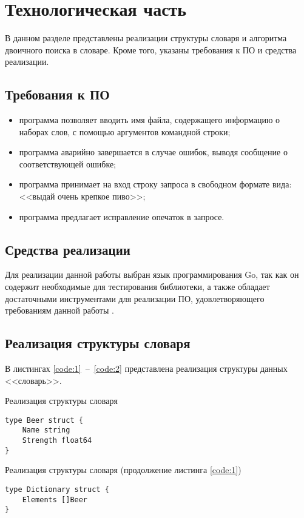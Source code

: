 \chapter{Технологическая часть}

В данном разделе представлены реализации структуры словаря и алгоритма двоичного поиска в словаре. Кроме того, указаны требования к ПО и средства реализации.

\section{Требования к ПО}
\begin{itemize}
	\item программа позволяет вводить имя файла, содержащего информацию о наборах слов, с помощью аргументов командной строки;
	\item программа аварийно завершается в случае ошибок, выводя сообщение о соответствующей ошибке;
	\item программа принимает на вход строку запроса в свободном формате вида: <<выдай очень крепкое пиво>>;
	\item программа предлагает исправление опечаток в запросе.
\end{itemize}

\section{Средства реализации}
Для реализации данной работы выбран язык программирования Go, так как он содержит необходимые для тестирования библиотеки, а также обладает достаточными инструментами для реализации ПО, удовлетворяющего требованиям данной работы \cite{bib:3}.

\section{Реализация структуры словаря}
В листингах \ref{code:1}~--~\ref{code:2} представлена реализация структуры данных <<словарь>>.

\begin{code}
\caption{Реализация структуры словаря}
\label{code:1}
\begin{verbatim}
type Beer struct {
	Name string
	Strength float64
}
\end{verbatim}
\end{code}

\newpage

\begin{code}
\caption{Реализация структуры словаря (продолжение листинга \ref{code:1})}
\label{code:2}
\begin{verbatim}
type Dictionary struct {
	Elements []Beer
}
\end{verbatim}
\end{code}

